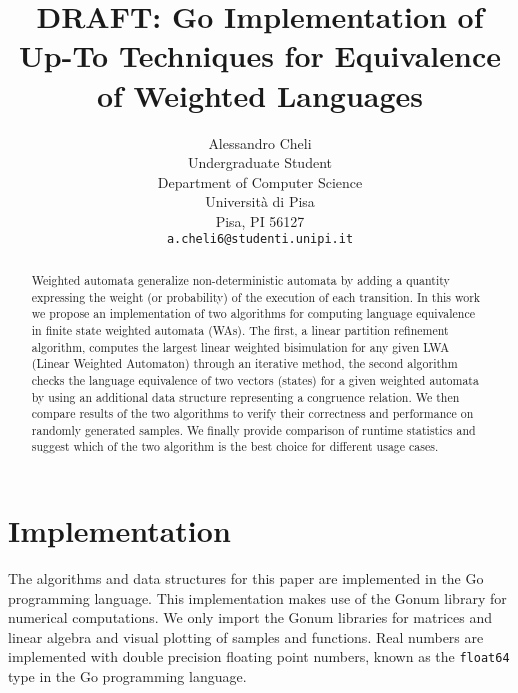 \documentclass{article}
\title{DRAFT: Go Implementation of Up-To Techniques for Equivalence of Weighted Languages}
\author{
  Alessandro Cheli \\
  Undergraduate Student \\
  Department of Computer Science \\
  Università di Pisa\\
  Pisa, PI 56127 \\
  \texttt{a.cheli6@studenti.unipi.it} \\
}
\theoremstyle{plain}%
\theoremstyle{definition}
\theoremstyle{remark}
\begin{document}
\maketitle

\begin{abstract}
Weighted automata generalize non-deterministic automata by adding
a quantity expressing the weight (or probability) of the execution of each transition.
In this work we propose an implementation of two algorithms for computing language 
equivalence in finite state weighted automata (WAs). The first, a
linear partition refinement algorithm, computes the largest linear weighted bisimulation
for any given LWA (Linear Weighted Automaton) through an iterative method, 
the second algorithm checks the language equivalence 
of two vectors (states) for a given weighted automata by using an additional
data structure representing a congruence relation.
We then compare results of the two algorithms to verify their correctness
and performance on randomly generated samples. 
We finally provide comparison of runtime statistics and suggest 
which of the two algorithm is the best choice for different usage cases.
\end{abstract}















\section{Implementation}
\label{sec:impl}

The algorithms and data structures for this paper are implemented in the Go programming 
language. This implementation makes use of the Gonum library for numerical 
computations. We only import the Gonum libraries for matrices and linear algebra 
and visual plotting of samples and functions.
Real numbers are implemented with double precision floating point numbers,  
known as the \texttt{float64} type in the Go programming language.
\end{document}
